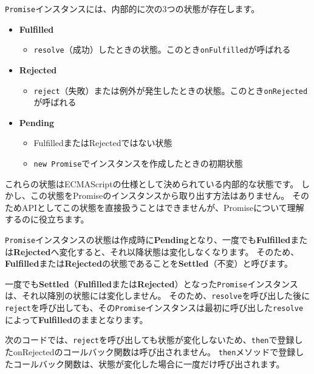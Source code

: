 \texttt{Promise}インスタンスには、内部的に次の3つの状態が存在します。

\begin{itemize}
\item
  \textbf{Fulfilled}

  \begin{itemize}
  \item
    \texttt{resolve}（成功）したときの状態。このとき\texttt{onFulfilled}が呼ばれる
  \end{itemize}
\item
  \textbf{Rejected}

  \begin{itemize}
  \item
    \texttt{reject}（失敗）または例外が発生したときの状態。このとき\texttt{onRejected}が呼ばれる
  \end{itemize}
\item
  \textbf{Pending}

  \begin{itemize}
  \item
    FulfilledまたはRejectedではない状態
  \item
    \texttt{new Promise}でインスタンスを作成したときの初期状態
  \end{itemize}
\end{itemize}

これらの状態はECMAScriptの仕様として決められている内部的な状態です。
しかし、この状態をPromiseのインスタンスから取り出す方法はありません。
そのためAPIとしてこの状態を直接扱うことはできませんが、Promiseについて理解するのに役立ちます。

\texttt{Promise}インスタンスの状態は作成時に\textbf{Pending}となり、一度でも\textbf{Fulfilled}または\textbf{Rejected}へ変化すると、それ以降状態は変化しなくなります。
そのため、\textbf{Fulfilled}または\textbf{Rejected}の状態であることを\textbf{Settled}（不変）と呼びます。

一度でも\textbf{Settled}（\textbf{Fulfilled}または\textbf{Rejected}）となった\texttt{Promise}インスタンスは、それ以降別の状態には変化しません。
そのため、\texttt{resolve}を呼び出した後に\texttt{reject}を呼び出しても、その\texttt{Promise}インスタンスは最初に呼び出した\texttt{resolve}によって\textbf{Fulfilled}のままとなります。

次のコードでは、\texttt{reject}を呼び出しても状態が変化しないため、\texttt{then}で登録したonRejectedのコールバック関数は呼び出されません。
\texttt{then}メソッドで登録したコールバック関数は、状態が変化した場合に一度だけ呼び出されます。

